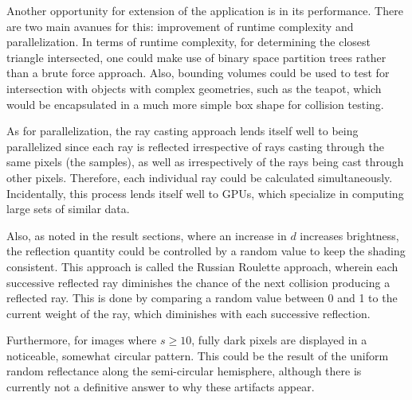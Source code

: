 \documentclass[12pt,journal]{IEEEtran}
\begin{document}
\par
Another opportunity for extension of the application is in its performance. There are two main avanues for this: improvement of runtime complexity and parallelization. In terms of runtime complexity, for determining the closest triangle intersected, one could make use of binary space partition trees rather than a brute force approach. Also, bounding volumes could be used to test for intersection with objects with complex geometries, such as the teapot, which would be encapsulated in a much more simple box shape for collision testing.

\par
As for parallelization, the ray casting approach lends itself well to being parallelized since each ray is reflected irrespective of rays casting through the same pixels (the samples), as well as irrespectively of the rays being cast through other pixels. Therefore, each individual ray could be calculated simultaneously. Incidentally, this process lends itself well to GPUs, which specialize in computing large sets of similar data.

\par
Also, as noted in the result sections, where an increase in $d$ increases brightness, the reflection quantity could be controlled by a random value to keep the shading consistent. This approach is called the Russian Roulette approach, wherein each successive reflected ray diminishes the chance of the next collision producing a reflected ray. This is done by comparing a random value between 0 and 1 to the current weight of the ray, which diminishes with each successive reflection.

\par
Furthermore, for images where $s \ge 10$, fully dark pixels are displayed in a noticeable, somewhat circular pattern. This could be the result of the uniform random reflectance along the semi-circular hemisphere, although there is currently not a definitive answer to why these artifacts appear.

\end{document}
